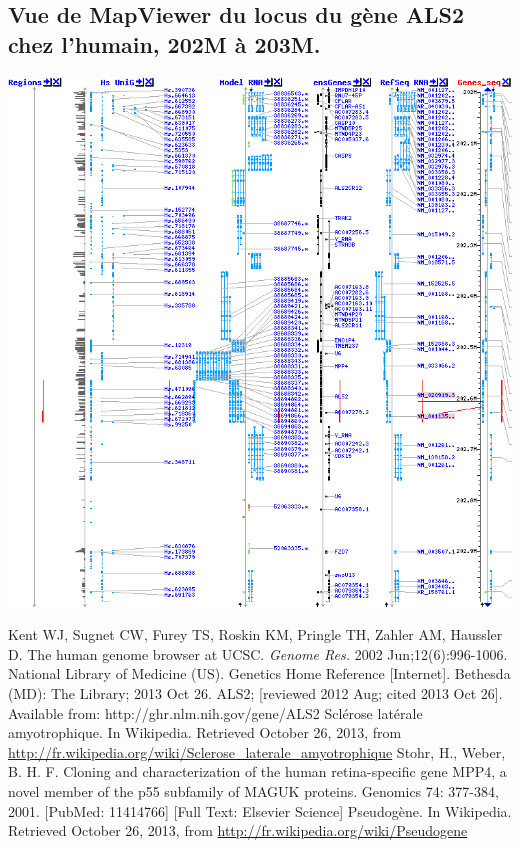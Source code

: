 \documentclass[11pt]{article} %
\begin{document}
\subsection{Vue de MapViewer du locus du gène ALS2 chez l'humain, 202M à 203M.}\label{4}
\includegraphics[width=\linewidth]{annexes/annexe1b_mapviewer_202M-203M.png}
\endgroup

%
%
\begin{thebibliography}{99}
    Kent WJ, Sugnet CW, Furey TS, Roskin KM, Pringle TH, Zahler AM, Haussler D. The human genome browser at UCSC. 
    \emph{Genome Res.} 2002 Jun;12(6):996-1006. 
    National Library of Medicine (US). Genetics Home Reference [Internet]. Bethesda (MD): The Library; 2013 Oct 26. ALS2; [reviewed 2012 Aug; cited 2013 Oct 26]. Available from: http://ghr.nlm.nih.gov/gene/ALS2
  Sclérose latérale amyotrophique. In Wikipedia. Retrieved October 26, 2013, from \url{http://fr.wikipedia.org/wiki/Sclerose_laterale_amyotrophique}
  Stohr, H., Weber, B. H. F. Cloning and characterization of the human retina-specific gene MPP4, a novel member of the p55 subfamily of MAGUK proteins. Genomics 74: 377-384, 2001. [PubMed: 11414766] [Full Text: Elsevier Science]
  Pseudogène. In Wikipedia. Retrieved October 26, 2013, from \url{http://fr.wikipedia.org/wiki/Pseudogene}

\end{thebibliography}
\end{document}
